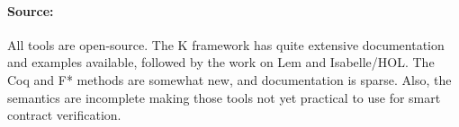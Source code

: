 \paragraph{Source:} All tools are open-source. The K framework has quite extensive documentation and examples available, followed by the work on Lem and Isabelle/HOL. The Coq and F* methods are somewhat new, and documentation is sparse. Also, the semantics are incomplete making those tools not yet practical to use for smart contract verification.